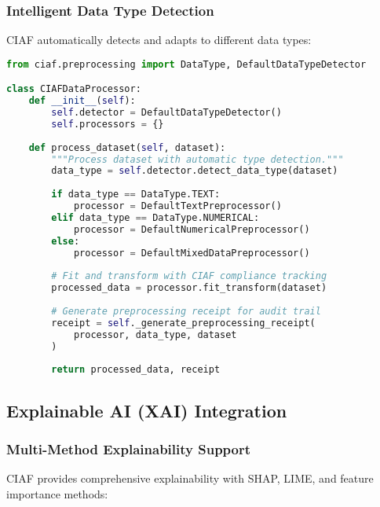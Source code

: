 \documentclass[12pt,a4paper]{article}
\begin{document}
\subsubsection{Intelligent Data Type Detection}

CIAF automatically detects and adapts to different data types:

\begin{lstlisting}[language=Python, caption=Data Type Detection Implementation]
from ciaf.preprocessing import DataType, DefaultDataTypeDetector

class CIAFDataProcessor:
    def __init__(self):
        self.detector = DefaultDataTypeDetector()
        self.processors = {}
    
    def process_dataset(self, dataset):
        """Process dataset with automatic type detection."""
        data_type = self.detector.detect_data_type(dataset)
        
        if data_type == DataType.TEXT:
            processor = DefaultTextPreprocessor()
        elif data_type == DataType.NUMERICAL:
            processor = DefaultNumericalPreprocessor()
        else:
            processor = DefaultMixedDataPreprocessor()
        
        # Fit and transform with CIAF compliance tracking
        processed_data = processor.fit_transform(dataset)
        
        # Generate preprocessing receipt for audit trail
        receipt = self._generate_preprocessing_receipt(
            processor, data_type, dataset
        )
        
        return processed_data, receipt
\end{lstlisting}

\subsection{Explainable AI (XAI) Integration}

\subsubsection{Multi-Method Explainability Support}

CIAF provides comprehensive explainability with SHAP, LIME, and feature importance methods:
\end{document}
